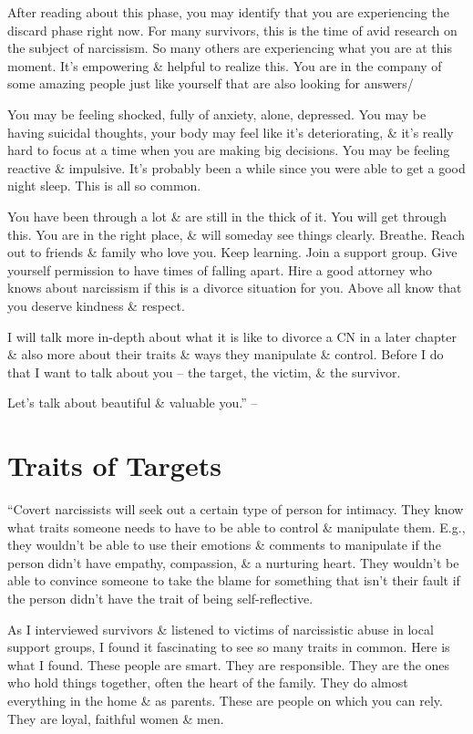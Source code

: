 \documentclass{article}
\numberwithin{equation}{section}
\begin{document}
After reading about this phase, you may identify that you are experiencing the discard phase right now. For many survivors, this is the time of avid research on the subject of narcissism. So many others are experiencing what you are at this moment. It's empowering \& helpful to realize this. You are in the company of some amazing people just like yourself that are also looking for answers/

You may be feeling shocked, fully of anxiety, alone, depressed. You may be having suicidal thoughts, your body may feel like it's deteriorating, \& it's really hard to focus at a time when you are making big decisions. You may be feeling reactive \& impulsive. It's probably been a while since you were able to get a good night sleep. This is all so common.

You have been through a lot \& are still in the thick of it. You will get through this. You are in the right place, \& will someday see things clearly. Breathe. Reach out to friends \& family who love you. Keep learning. Join a support group. Give yourself permission to have times of falling apart. Hire a good attorney who knows about narcissism if this is a divorce situation for you. Above all know that you deserve kindness \& respect.

I will talk more in-depth about what it is like to divorce a CN in a later chapter \& also more about their traits \& ways they manipulate \& control. Before I do that I want to talk about you -- the target, the victim, \& the survivor.

Let's talk about beautiful \& valuable you.'' -- \cite[pp. 40--45]{Mirza2017}


\section{Traits of Targets}
``Covert narcissists will seek out a certain type of person for intimacy. They know what traits someone needs to have to be able to control \& manipulate them. E.g., they wouldn't be able to use their emotions \& comments to manipulate if the person didn't have empathy, compassion, \& a nurturing heart. They wouldn't be able to convince someone to take the blame for something that isn't their fault if the person didn't have the trait of being self-reflective.

As I interviewed survivors \& listened to victims of narcissistic abuse in local support groups, I found it fascinating to see so many traits in common. Here is what I found. These people are smart. They are responsible. They are the ones who hold things together, often the heart of the family. They do almost everything in the home \& as parents. These are people on which you can rely. They are loyal, faithful women \& men.
\end{document}
